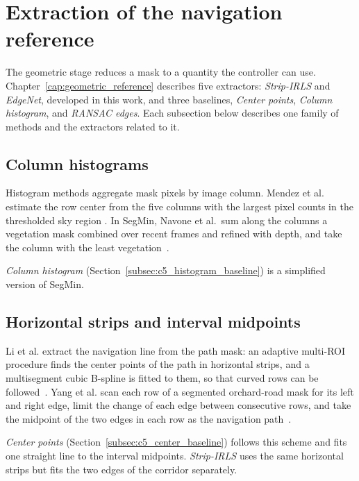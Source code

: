 \section{Extraction of the navigation reference}
\label{sec:geometric_extraction}

The geometric stage reduces a mask to a quantity the controller can use.
Chapter~\ref{cap:geometric_reference} describes five extractors:
\textit{Strip-IRLS} and \textit{EdgeNet}, developed in this work, and
three baselines, \textit{Center points}, \textit{Column histogram}, and
\textit{RANSAC edges}. Each subsection below describes one family of
methods and the extractors related to it.

\subsection{Column histograms}
\label{subsec:histogram_methods}

Histogram methods aggregate mask pixels by image column. Mendez et al.
estimate the row center from the five columns with the largest pixel
counts in the thresholded sky region
\cite{mendez2023vineyards}. In SegMin, Navone et al.\ sum
along the columns a vegetation mask combined over recent frames and
refined with depth, and take the column with the least
vegetation~\cite{navone2025gpsfree}.

\textit{Column histogram} (Section~\ref{subsec:c5_histogram_baseline}) is a simplified
version of SegMin.

\subsection{Horizontal strips and interval midpoints}
\label{subsec:strip_methods}

Li et al. extract the navigation line from the path mask: an adaptive multi-ROI
procedure finds the center points of the path in horizontal strips, and a
multisegment cubic B-spline is fitted to them, so that curved rows can be followed~\cite{li2022multiroi}. Yang et al. scan each
row of a segmented orchard-road mask for its left and right edge, limit
the change of each edge between consecutive rows, and take the midpoint
of the two edges in each row as the navigation
path~\cite{yang2022orchard}.

\textit{Center points} (Section~\ref{subsec:c5_center_baseline}) follows
this scheme and fits one straight line to the interval midpoints.
\textit{Strip-IRLS} uses the same horizontal strips but fits the two
edges of the corridor separately.

